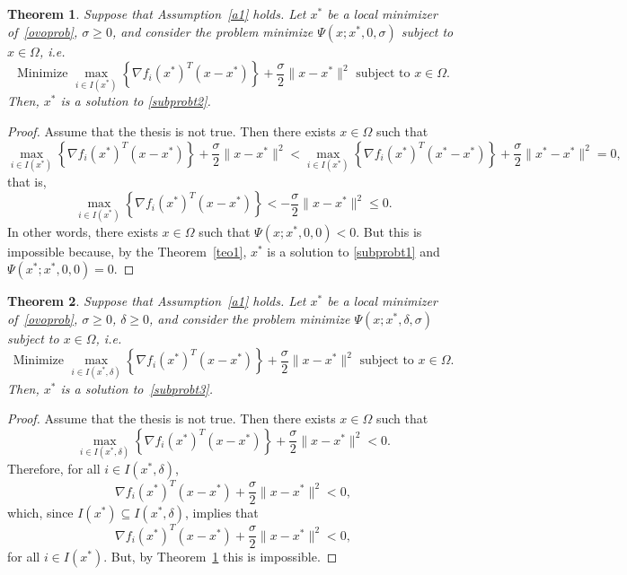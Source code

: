 \documentclass[11pt]{article}
\newtheorem{theorem}{Theorem}[section]
\begin{document}
\begin{theorem} \label{teo2}
Suppose that Assumption~\ref{a1} holds. Let $x^*$ be a local minimizer of~\eqref{ovoprob}, $\sigma \geq 0$, and consider the problem minimize $\Psi(x;x^*,0,\sigma)$ subject to $x \in \Omega$, i.e.\
\begin{equation} \label{subprobt2}
\mbox{Minimize } \max_{i \in I(x^*)} \left\{ \nabla f_i(x^*)^T (x - x^*) \right\} + \dfrac{\sigma}{2} \| x -x^* \|^2 \mbox{ subject to } x \in \Omega.
\end{equation}
Then, $x^*$ is a solution to \eqref{subprobt2}.
\end{theorem}
\begin{proof}
Assume that the thesis is not true. Then there exists $x \in \Omega$ such that
\[
\max_{i \in I(x^*)} \left\{ \nabla f_i(x^*)^T (x - x^*) \right\} + \dfrac{\sigma}{2} \|x - x^*\|^2 < \max_{i \in I(x^*)} \left\{ \nabla f_i(x^*)^T (x^* - x^*) \right\} + \dfrac{\sigma}{2} \|x^* - x^*\|^2=0,
\]
that is,
\[
\max_{i\in I(x^*)}\left\{\nabla f_i(x^*)^T(x-x^*)\right\}<-\dfrac{\sigma}{2}\|x-x^*\|^2\leq 0. 
\]
In other words, there exists $x \in \Omega$ such that $\Psi(x;x^*,0,0)<0$. But this is impossible because, by the Theorem~\ref{teo1}, $x^*$ is a solution to \eqref{subprobt1} and $\Psi(x^*;x^*,0,0)=0$.
\end{proof}

\begin{theorem} \label{teo3}
Suppose that Assumption~\ref{a1} holds. Let $x^*$ be a local minimizer
of~\eqref{ovoprob}, $\sigma \geq 0$, $\delta \geq 0$, and consider the
problem minimize $\Psi(x;x^*,\delta,\sigma)$ subject to $x \in \Omega$, i.e.\
\begin{equation} \label{subprobt3}
\mbox{Minimize } \max_{i \in I(x^*,\delta) } \left\{ \nabla f_i(x^*)^T (x - x^*) \right\} + \dfrac{\sigma}{2} \| x - x^* \|^2 \mbox{ subject to } x \in \Omega.
\end{equation}
Then, $x^*$ is a solution to~\eqref{subprobt3}.
\end{theorem}

\begin{proof}
Assume that the thesis is not true. Then there exists $x \in \Omega$ such that
\[
\max_{i\in I(x^*,\delta)} \left\{ \nabla f_i(x^*)^T (x - x^*) \right\} + \dfrac{\sigma}{2} \|x - x^*\|^2 < 0.
\]
Therefore, for all $i \in I(x^*,\delta)$, 
\[
\nabla f_i(x^*)^T (x - x^*) + \dfrac{\sigma}{2} \|x - x^*\|^2  < 0,
\]
which, since $I(x^*) \subseteq I(x^*,\delta)$, implies that 
\[
\nabla f_i(x^*)^T (x - x^*) + \dfrac{\sigma}{2} \|x - x^*\|^2  < 0,
\]
for all $i \in I(x^*)$. But, by Theorem~\ref{teo2} this is impossible.
\end{proof}
\end{document}
